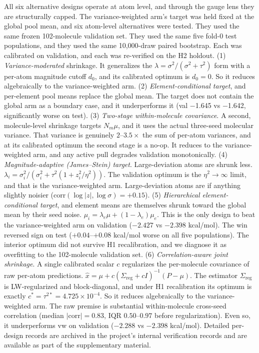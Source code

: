 \documentclass{article}
\begin{document}
All six alternative designs operate at atom level, and through the gauge lens they are structurally capped. The variance-weighted arm's target was held fixed at the global pool mean, and six atom-level alternatives were tested.
They used the same frozen 102-molecule validation set. They used the same
five fold-0 test populations, and they used the same 10{,}000-draw paired
bootstrap. Each was calibrated on validation, and each was re-verified on the H2
holdout. (1) \emph{Variance-moderated} shrinkage. It generalizes the
$\lambda = \sigma^2/(\sigma^2+\tau^2)$ form with a per-atom magnitude cutoff
$d_0$, and its calibrated optimum is $d_0 = 0$. So it reduces algebraically to
the variance-weighted arm. (2)
\emph{Element-conditional target}, and per-element pool means replace the global
mean. The target does not contain the global arm as a boundary case, and it
underperforms it (val $-$1.645 vs $-$1.642, significantly worse on test). (3)
\emph{Two-stage within-molecule covariance}. A second, molecule-level
shrinkage targets $N_m \mu$, and it uses the actual three-seed molecular
variance. That variance is genuinely $2$--$3.5\times$ the sum of per-atom
variances, and at its calibrated optimum the second stage is a no-op. It reduces
to the variance-weighted arm, and any active pull degrades validation
monotonically.
(4) \emph{Magnitude-adaptive (James--Stein) target}. Large-deviation atoms
are shrunk less. $\lambda_i = \sigma^2_i/(\sigma^2_i + \tau^2(1+z_i^2/\eta^2))$.
The validation optimum is the $\eta^2 \to \infty$ limit, and that is the
variance-weighted arm. Large-deviation atoms are if anything slightly noisier
($\mathrm{corr}(\log|z|, \log \sigma) = +0.15$). (5) \emph{Hierarchical
element-conditional target}, and element means are themselves shrunk toward the
global mean by their seed noise.
$\mu_i = \lambda_e \mu + (1-\lambda_e)\mu_e$. This is the only design to beat
the variance-weighted arm on validation ($-2.427$ vs $-2.398$ kcal/mol). The
win reversed sign on test ($+0.04$--$+0.08$ kcal/mol worse on all five
populations). The interior optimum did not survive H1 recalibration, and we
diagnose it as overfitting to the 102-molecule validation set. (6)
\emph{Correlation-aware joint shrinkage}. A single calibrated scalar $c$
regularizes the per-molecule covariance of raw per-atom predictions.
$\hat{x} = \mu + c(\Sigma_{\mathrm{reg}} + cI)^{-1}(P - \mu)$. The estimator
$\Sigma_{\mathrm{reg}}$ is LW-regularized and block-diagonal, and under H1
recalibration its optimum is exactly $c^* = \tau^{2*} = 4.725\times 10^{-4}$.
So it reduces algebraically to the variance-weighted arm. The raw premise is
substantial within-molecule cross-seed correlation (median
$|\mathrm{corr}| = 0.83$, IQR $0.50$--$0.97$ before regularization). Even
so, it underperforms vw on validation ($-2.288$ vs $-2.398$ kcal/mol).
Detailed per-design records are archived in the project's internal
verification records and are available as part of the supplementary material.
\end{document}
